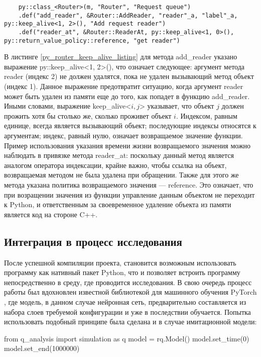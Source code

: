  \begin{lstlisting}
 	py::class_<Router>(m, "Router", "Request queue")
 	.def("add_reader", &Router::AddReader, "reader"_a, "label"_a, py::keep_alive<1, 2>(), "Add request reader")
 	.def("reader_at", &Router::ReaderAt, py::keep_alive<1, 0>(), py::return_value_policy::reference, "get reader")
 \end{lstlisting}

В листинге \ref{py_router_keep_alive_listing} для метода add\_reader указано выражение py::keep\_alive<1, 2>(), что означает следующее: аргумент метода reader (индекс 2) не должен удалятся, пока не удален вызывающий метод объект (индекс 1). Данное выражение предотвратит ситуацию, когда аргумент reader может быть удален из памяти еще до того, как попадет в функцию add\_reader. Иными словами, выражение keep\_alive<$i,j$> указывает, что объект $j$ должен прожить хотя бы столько же, сколько проживет объект $i$. Индексом, равным единице, всегда является вызывающий объект; последующие индексы относятся к аргументам; индекс, равный нулю, означает возвращаемое значение функции. Пример использования указания времени жизни возвращаемого значения можно наблюдать в привязке метода reader\_at: поскольку данный метод является аналогом оператора индексации, крайне важно, чтобы ссылка на объект, возвращаемая методом не была удалена при обращении. Также для этого же метода указана политика возвращаемого значения --- reference. Это означает, что при возращении значения из функции управление данным объектом не переходит к Python, и ответственным за своевременное удаление объекта из памяти является код на стороне C++.

\subsection{Интеграция в процесс исследования}
После успешной компиляции проекта, становится возможным использовать программу как нативный пакет Python, что и позволяет встроить программу непосредственно в среду, где проводится исследования. В свою очередь процесс работы был вдохновлен известной библиотекой для машинного обучения PyTorch \cite{pytorch}, где модель, в данном случае нейронная сеть, предварительно составляется из набора слоев требуемой конфигурации и уже в последствии обучается. Попытка использовать подобный принципе была сделана и в случае имитационной модели: 
\begin{pyin} [pyexampleinit]
from q_analysis import simulation as q
model = rq.Model()
model.set_time(0) 
model.set_end(1000000)
\end{pyin}


